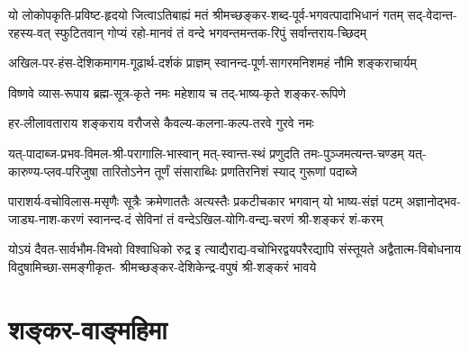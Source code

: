 
\fourlineindentedshloka
{यो लोकोपकृति-प्रविष्ट-हृदयो जित्वाऽतिबाह्यं मतं}
{श्रीमच्छङ्कर-शब्द-पूर्व-भगवत्पादाभिधानं गतम्}
{सद्-वेदान्त-रहस्य-वत् स्फुटितवान् गोप्यं रहो-मानवं}
{तं वन्दे भगवन्तमन्तक-रिपुं सर्वान्तराय-च्छिदम्}


\twolineshloka
{अखिल-पर-हंस-देशिकमागम-गूढार्थ-दर्शकं प्राज्ञम्}
{स्वानन्द-पूर्ण-सागरमनिशमहं नौमि शङ्कराचार्यम्}


\twolineshloka
{विष्णवे व्यास-रूपाय ब्रह्म-सूत्र-कृते नमः}
{महेशाय च तद्-भाष्य-कृते शङ्कर-रूपिणे}


\twolineshloka
{हर-लीलावताराय शङ्कराय वरौजसे}
{कैवल्य-कलना-कल्प-तरवे गुरवे नमः}


\fourlineindentedshloka
{यत्-पादाब्ज-प्रभव-विमल-श्री-परागालि-भास्वान्}
{मत्-स्वान्त-स्थं प्रणुदति तमः-पुञ्जमत्यन्त-चण्डम्}
{यत्-कारुण्य-प्लव-परिजुषा तारितोऽनेन तूर्णं}
{संसाराब्धिः प्रणतिरनिशं स्याद् गुरूणां पदाब्जे}


\fourlineindentedshloka
{पाराशर्य-वचोविलास-मसृणैः सूत्रैः क्रमेणाततैः}
{अत्यस्तैः प्रकटीचकार भगवान् यो भाष्य-संज्ञं पटम्}
{अज्ञानोद्भव-जाड्य-नाश-करणं स्वानन्द-दं सेविनां}
{तं वन्देऽखिल-योगि-वन्द्य-चरणं श्री-शङ्करं शं-करम्}


\fourlineindentedshloka
{योऽयं दैवत-सार्वभौम-विभवो विश्वाधिको रुद्र इ}
{त्याद्यैराद्य-वचोभिरद्वयपरैरद्यापि संस्तूयते}
{अद्वैतात्म-विबोधनाय विदुषामिच्छा-समङ्गीकृत-}
{श्रीमच्छङ्कर-देशिकेन्द्र-वपुषं श्री-शङ्करं भावये}


\section{शङ्कर-वाङ्महिमा}


